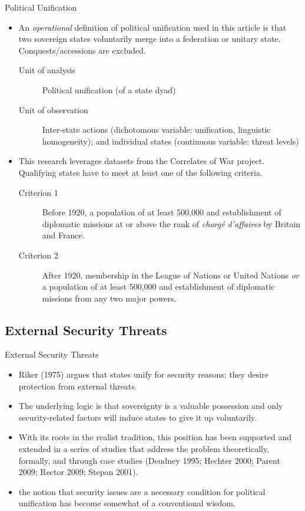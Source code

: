 \documentclass{beamer}
\begin{document}
	\begin{frame}{Political Unification}
		\begin{itemize}
			\item An \textit{operational} definition of political unification used in this article is that two sovereign states voluntarily merge into a federation or unitary state. Conquests/accessions are excluded.
			\begin{description}
				\item[Unit of analysis] Political unification (of a state dyad)
				\item[Unit of observation] Inter-state actions (dichotomous variable: unification, linguistic homogeneity); and individual states (continuous variable: threat levels)
			\end{description}
		\end{itemize}

		\begin{itemize}
			\item This research leverages datasets from the Correlates of War project. Qualifying states have to meet at least one of the following criteria.
			\begin{description}
				\item[Criterion 1] Before 1920, a population of at least 500,000 and establishment of diplomatic missions at or above the rank of \textit{chargé d'affaires} by Britain and France.
				\item[Criterion 2] After 1920, membership in the League of Nations or United Nations \textit{or} a population of at least 500,000 and establishment of diplomatic missions from any two major powers.
			\end{description}
		\end{itemize}
	\end{frame}




	\subsection{External Security Threats}
	\begin{frame}{External Security Threats}
		\begin{itemize}
			\item Riker (1975) argues that states unify for security reasons; they desire protection from external threats.
			\item The underlying logic is that sovereignty is a valuable possession and only security-related factors will induce states to give it up voluntarily.
			\item With its roots in the realist tradition, this position has been supported and extended in a series of studies that address the problem theoretically, formally, and through case studies (Deudney 1995; Hechter 2000; Parent 2009; Rector 2009; Stepan 2001).
			\item the notion that security issues are a necessary condition for political unification has become somewhat of a conventional wisdom.
		\end{itemize}
	\end{frame}
\end{document}
